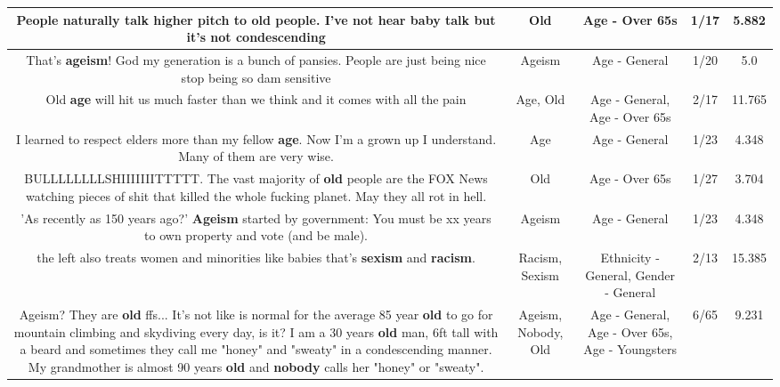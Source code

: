 \documentclass[11pt]{article}
\newlength\mylength
\begin{document}
\begin{center}
\begin{longtable}{|C{.65\mylength}|C{.30\mylength}|C{.12\mylength}|C{.12\mylength}|C{.12\mylength}|}
  \small People naturally talk higher pitch to \textbf{old} people. I've not hear baby talk but it's not condescending\normalsize   & Old & Age - Over 65s & 1/17 & 5.882 \\  \hline
  \small That's \textbf{ageism}!  God my generation is a bunch of pansies.  People are just being nice stop being so dam sensitive\normalsize   & Ageism & Age - General & 1/20 & 5.0 \\  \hline
  \small Old \textbf{age} will hit us much faster than we think and it comes with all the pain\normalsize   & Age, Old & Age - General, Age - Over 65s & 2/17 & 11.765 \\  \hline
  \small I learned to respect elders more than my fellow \textbf{age}. Now I'm a grown up I understand. Many of them are very wise.\normalsize   & Age & Age - General & 1/23 & 4.348 \\  \hline
  \small BULLLLLLLLSHIIIIIIITTTTT.  The vast majority of \textbf{old} people are the FOX News watching pieces of shit that killed the whole fucking planet.  May they all rot in hell.\normalsize   & Old & Age - Over 65s & 1/27 & 3.704 \\  \hline
  \small 'As recently as 150 years ago?' \textbf{Ageism} started by government: You must be xx years to own property and vote (and be male).\normalsize   & Ageism & Age - General & 1/23 & 4.348 \\  \hline
  \small the left also treats women and minorities like babies that's \textbf{sexism} and \textbf{racism}.\normalsize   & Racism, Sexism & Ethnicity - General, Gender - General & 2/13 & 15.385 \\  \hline
  \small Ageism? They are \textbf{old} ffs... It's not like is normal for the average 85 year \textbf{old} to go for mountain climbing and skydiving every day, is it? I am a 30 years \textbf{old} man, 6ft tall with a beard and sometimes they call me "honey" and "sweaty" in a condescending manner. My grandmother is almost 90 years \textbf{old} and \textbf{nobody} calls her "honey" or "sweaty".\normalsize   & Ageism, Nobody, Old & Age - General, Age - Over 65s, Age - Youngsters & 6/65 & 9.231 \\  \hline

\end{longtable}
\end{center}
\end{document}
